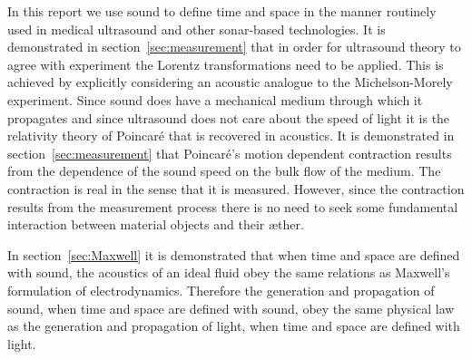 \documentclass[10pt, fleqn,final,showtrims,oldfontcommands, article,a4paper,oneside]{memoir} %
\newcommand{\secref}[1]{section~\ref{sec:#1}}
\newcommand{\aether}{\ae ther}
\newcommand{\Poincare}{Poincar{\'e}\xspace}
\begin{document}






In this report we use sound to define time and space 
in the manner  routinely used in medical ultrasound and other sonar-based technologies.
It is demonstrated in section~\ref{sec:measurement} that in order for ultrasound theory 
to agree with experiment the Lorentz transformations need to be applied.
This is achieved by explicitly considering an acoustic analogue to the Michelson-Morely experiment.
Since sound  does have a mechanical medium through which it propagates and since ultrasound does not care about the speed of light
it is the relativity theory of \Poincare that is recovered in acoustics.
It is demonstrated in  \secref{measurement} that \Poincare's motion dependent contraction 
results from the dependence of the  sound speed on the bulk flow of the medium.
The contraction is real in the sense that it is measured.
However, since the contraction results from the measurement process there is 
no need to seek some fundamental interaction between material objects and their \aether.

In section~\ref{sec:Maxwell} it is demonstrated that  when time and space are defined with sound, 
the acoustics of an ideal fluid obey the same relations as Maxwell's formulation of electrodynamics.
Therefore the generation and propagation of sound,  when time and space are defined with  sound,
obey the same physical law as the generation and propagation of light,  when time and space are defined with light.
\end{document}
